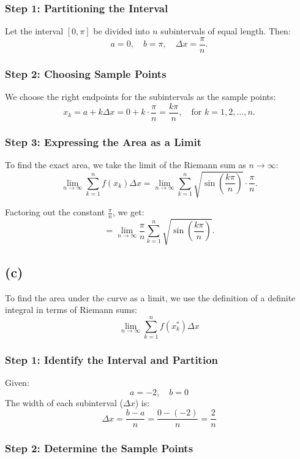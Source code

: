 \documentclass{article}
\begin{document}
\subsubsection*{Step 1: Partitioning the Interval}
Let the interval \([0, \pi]\) be divided into \(n\) subintervals of equal length. Then:
\[
a = 0, \quad b = \pi, \quad \Delta x = \frac{\pi}{n}.
\]

\subsubsection*{Step 2: Choosing Sample Points}
We choose the right endpoints for the subintervals as the sample points:
\[
x_k = a + k\Delta x = 0 + k \cdot \frac{\pi}{n} = \frac{k\pi}{n}, \quad \text{for } k = 1, 2, \dots, n.
\]



\subsubsection*{Step 3: Expressing the Area as a Limit}
To find the exact area, we take the limit of the Riemann sum as \(n \to \infty\):
\[
\lim_{n \to \infty} \sum_{k=1}^{n} f(x_k) \Delta x = \lim_{n \to \infty} \sum_{k=1}^{n} \sqrt{\sin\left(\frac{k\pi}{n}\right)} \cdot \frac{\pi}{n}.
\]

Factoring out the constant \(\frac{\pi}{n}\), we get:
\[
= \lim_{n \to \infty} \frac{\pi}{n} \sum_{k=1}^{n} \sqrt{\sin\left(\frac{k\pi}{n}\right)}.
\]

\subsection*{(c)}
To find the area under the curve as a limit, we use the definition of a definite integral in terms of Riemann sums:
\\
\[
\lim_{n \to \infty} \sum_{k=1}^{n} f(x_k^{*}) \Delta x
\]

\subsubsection*{Step 1: Identify the Interval and Partition}
Given:
\\
\[
 a = -2, \quad b = 0
\]
The width of each subinterval ($\Delta x$) is:
\\
\[
\Delta x = \frac{b - a}{n} = \frac{0 - (-2)}{n} = \frac{2}{n}
\]

\subsubsection*{Step 2: Determine the Sample Points}
\end{document}
